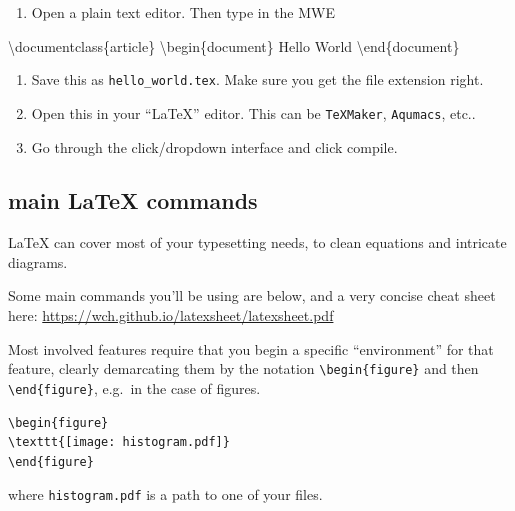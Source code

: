 \documentclass[
  letterpaper,
]{book}
\newenvironment{Shaded}{\begin{snugshade}}{\end{snugshade}}
\newcommand{\ExtensionTok}[1]{\textcolor[rgb]{0.00,0.23,0.31}{#1}}
\newcommand{\NormalTok}[1]{\textcolor[rgb]{0.00,0.23,0.31}{#1}}
\providecommand{\tightlist}{%
  \setlength{\itemsep}{0pt}\setlength{\parskip}{0pt}}\usepackage{longtable,booktabs,array}
\theoremstyle{definition}
\theoremstyle{definition}
\theoremstyle{plain}
\theoremstyle{definition}
\theoremstyle{plain}
\theoremstyle{plain}
\theoremstyle{remark}
\begin{document}
\begin{enumerate}
\def\labelenumi{\arabic{enumi}.}
\tightlist
\item
  Open a plain text editor. Then type in the MWE
\end{enumerate}

\begin{Shaded}
\begin{Highlighting}[]
\ExtensionTok{\textbackslash{}documentclass\{article\}}
\ExtensionTok{\textbackslash{}begin\{document\}}
\ExtensionTok{Hello}\NormalTok{ World}
\ExtensionTok{\textbackslash{}end\{document\}}
\end{Highlighting}
\end{Shaded}

\begin{enumerate}
\def\labelenumi{\arabic{enumi}.}
\setcounter{enumi}{1}
\tightlist
\item
  Save this as \texttt{hello\_world.tex}. Make sure you get the file
  extension right.
\item
  Open this in your ``LaTeX'' editor. This can be \texttt{TeXMaker},
  \texttt{Aqumacs}, etc..
\item
  Go through the click/dropdown interface and click compile.
\end{enumerate}

\hypertarget{main-latex-commands}{%
\subsection{main LaTeX commands}\label{main-latex-commands}}

LaTeX can cover most of your typesetting needs, to clean equations and
intricate diagrams.

Some main commands you'll be using are below, and a very concise cheat
sheet here: \url{https://wch.github.io/latexsheet/latexsheet.pdf}

Most involved features require that you begin a specific ``environment''
for that feature, clearly demarcating them by the notation
\texttt{\textbackslash{}begin\{figure\}} and then
\texttt{\textbackslash{}end\{figure\}}, e.g.~in the case of figures.

\begin{verbatim}
\begin{figure}
\texttt{[image: histogram.pdf]}
\end{figure}
\end{verbatim}

where \texttt{histogram.pdf} is a path to one of your files.
\end{document}
